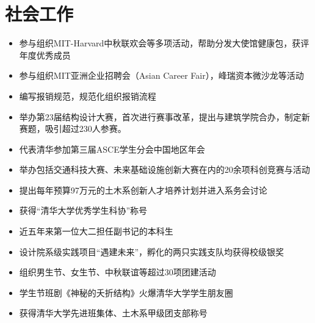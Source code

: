 
\section{社会工作}
\begin{itemize}[parsep=0.5ex]
  \item 参与组织MIT-Harvard中秋联欢会等多项活动，帮助分发大使馆健康包，获评年度优秀成员
\end{itemize}
\begin{itemize}[parsep=0.5ex]
  \item 参与组织MIT亚洲企业招聘会（Asian Career Fair），峰瑞资本微沙龙等活动
  \item 编写报销规范，规范化组织报销流程
\end{itemize}
\begin{itemize}[parsep=0.5ex]
  \item 举办第23届结构设计大赛，首次进行赛事改革，提出与建筑学院合办，制定新赛题，吸引超过230人参赛。
  \item 代表清华参加第三届ASCE学生分会中国地区年会
\end{itemize}
\begin{itemize}[parsep=0.5ex]
  \item 举办包括交通科技大赛、未来基础设施创新大赛在内的20余项科创竞赛与活动
  \item 提出每年预算97万元的土木系创新人才培养计划并进入系务会讨论
  \item 获得“清华大学优秀学生科协”称号
\end{itemize}
\begin{itemize}[parsep=0.5ex]
  \item 近五年来第一位大二担任副书记的本科生
  \item 设计院系级实践项目“遇建未来”，孵化的两只实践支队均获得校级银奖
\end{itemize}
\begin{itemize}[parsep=0.5ex]
  \item 组织男生节、女生节、中秋联谊等超过30项团建活动
  \item 学生节班剧《神秘的夭折结构》火爆清华大学学生朋友圈
  \item 获得清华大学先进班集体、土木系甲级团支部称号
\end{itemize}